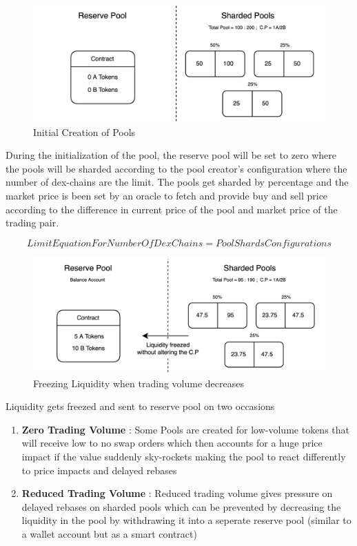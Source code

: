 \documentclass[10pt]{article}
\begin{document}
\begin{figure}[H]
\begin{center}
\includegraphics[width=13cm]{reserve-pool-1}
\caption{Initial Creation of Pools}
\end{center}
\end{figure}

During the initialization of the pool, the reserve pool will be set to zero where the pools will be sharded according to the pool creator's configuration where the number of dex-chains are the limit. The pools get sharded by percentage and the market price is been set by an oracle to fetch and provide buy and sell price according to the difference in current price of the pool and market price of the trading pair.

\begin{equation}
Limit Equation For Number Of Dex Chains = Pool Shards Configurations
\end{equation}

\begin{figure}[H]
\begin{center}
\includegraphics[width=13cm]{reserve-pool-2}
\caption{Freezing Liquidity when trading volume decreases}
\end{center}
\end{figure}

Liquidity gets freezed and sent to reserve pool on two occasions
\begin{enumerate}[leftmargin=+0.2in]
\item \textbf{Zero Trading Volume} : Some Pools are created for low-volume tokens that will receive low to no swap orders which then accounts for a huge price impact if the value suddenly sky-rockets making the pool to react differently to price impacts and delayed rebases
\item \textbf{Reduced Trading Volume} : Reduced trading volume gives pressure on delayed rebases on sharded pools which can be prevented by decreasing the liquidity in the pool by withdrawing it into a seperate reserve pool (similar to a wallet account but as a smart contract) 
\end{enumerate}
\end{document}
